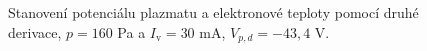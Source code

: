 \documentclass[a4paper,12pt]{article}
\begin{document}
\newpage
\begin{figure}[h]
	\centering
	\begin{subfigure}[b]{.49\textwidth}
		\centering
	\end{subfigure}
	\begin{subfigure}[b]{.49\textwidth}
		\centering
	\end{subfigure}
	\caption{Stanovení potenciálu plazmatu a elektronové teploty pomocí druhé 
	derivace, $p = 160$ 
	\si{\pascal} a $I_\text{v} = 30$ \si{\milli\ampere}, $V_{p,d} = 
	-43,4$ V.}
	\label{data1sec}
\end{figure}
\end{document}
